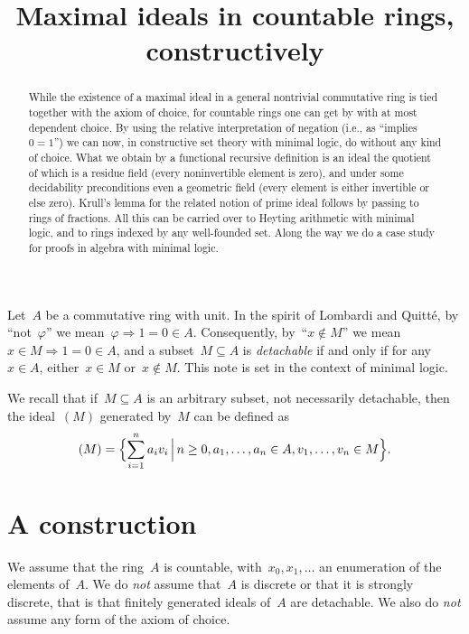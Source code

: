 \documentclass[12pt,oneside,reqno]{amsart}
\title{Maximal ideals in countable rings, constructively}
\author{}
\theoremstyle{definition}
\theoremstyle{plain}
\theoremstyle{remark}
\renewcommand{\_}{\mathpunct{.}\,}
\begin{document}
\begin{abstract}
  While the existence of a maximal ideal in a general nontrivial commutative
  ring is tied together with the axiom of choice, for countable rings one can
  get by with at most dependent choice. By using the relative interpretation of
  negation (i.e., as ``implies~$0=1$'') we can now, in constructive set theory with
  minimal logic, do without any kind of choice. What we obtain by a functional
  recursive definition is an ideal the quotient of which is a residue field
  (every noninvertible element is zero), and under some decidability
  preconditions even a geometric field (every element is either invertible or
  else zero). Krull's lemma for the related notion of prime ideal follows by
  passing to rings of fractions. All this can be carried over to Heyting
  arithmetic with minimal logic, and to rings indexed by any well-founded set.
  Along the way we do a case study for proofs in algebra with minimal logic.
\end{abstract}


\maketitle
\thispagestyle{empty}


Let~$A$ be a commutative ring with unit. In the spirit of Lombardi and Quitté,
by ``not~$\varphi$'' we mean~$\varphi \Rightarrow 1 = 0 \in A$. Consequently,
by~``$x \not\in M$'' we mean~$x \in M \Rightarrow 1 = 0 \in A$, and a subset~$M
\subseteq A$ is \emph{detachable} if and only if for any~$x \in A$, either~$x \in M$
or~$x \not\in M$. This note is set in the context of minimal logic.

We recall that if~$M \subseteq A$ is an arbitrary subset, not necessarily
detachable, then the ideal~$(M)$ generated by~$M$ can be defined
as \[ (M) = \Bigl\{ \sum_{i=1}^n a_i v_i \,\Big|\, n \geq 0, a_1,\ldots,a_n \in
A, v_1,\ldots,v_n \in M \Bigr\}. \]


\section{A construction}
\label{sect:constr}

We assume that the ring~$A$ is countable, with~$x_0, x_1, \ldots$ an
enumeration of the elements of~$A$. We do \emph{not} assume that~$A$ is
discrete or that it is strongly discrete, that is that finitely generated
ideals of~$A$ are detachable. We also do
\emph{not} assume any form of the axiom of choice.
\end{document}
